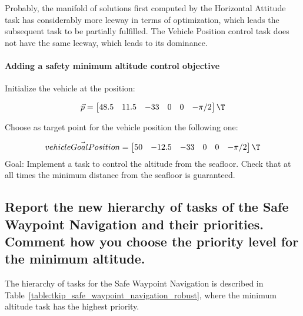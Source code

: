 \begin{questions}
\begin{parts}
\begin{solutionorbox}
			Probably, the manifold of solutions first computed by
			the Horizontal Attitude task has considerably more
			leeway in terms of optimization, which leads the
			subsequent task to be partially fulfilled. The Vehicle
			Position control task does not have the same leeway,
			which leads to its dominance.
		\end{solutionorbox}
	\end{parts}

	\subsection{Adding a safety minimum altitude control objective}
	\question
	Initialize the vehicle at the position:

	\begin{displaymath}
		\vec{p}
		=
		\begin{bmatrix}
			48.5 & 11.5 & -33 & 0 & 0 &-\pi/2
		\end{bmatrix}\T
	\end{displaymath}

	Choose as target point for the vehicle position the following one:

	\begin{displaymath}
		\vec{vehicleGoalPosition}
		=
		\begin{bmatrix}
			50 & -12.5 & -33 & 0 & 0 & -\pi/2
		\end{bmatrix}\T
	\end{displaymath}
	Goal: Implement a task to control the altitude from the seafloor. Check that at
	all times the minimum distance from the seafloor is guaranteed.

	\begin{parts}
		\part{Report the new hierarchy of tasks of the Safe Waypoint
			Navigation and their priorities. Comment how you choose the priority level for
		the minimum altitude.}

		\begin{solutionorbox}
			The hierarchy of tasks for the Safe Waypoint Navigation
			is described in
			Table~\ref{table:tkip_safe_waypoint_navigation_robust}, where
			the minimum altitude task has the highest priority.


\end{solutionorbox}
\end{parts}
\end{questions}
